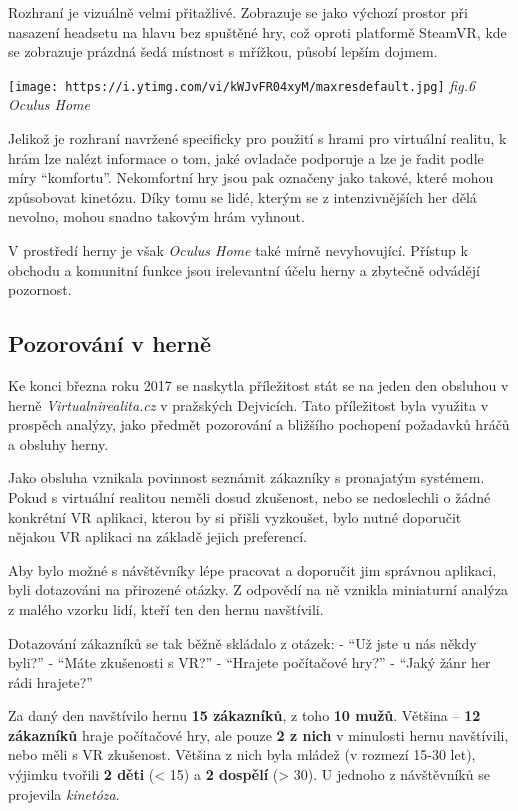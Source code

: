 Rozhraní je vizuálně velmi přitažlivé. Zobrazuje se jako výchozí prostor
při nasazení headsetu na hlavu bez spuštěné hry, což oproti platformě
SteamVR, kde se zobrazuje prázdná šedá místnost s mřížkou, působí lepším
dojmem.

\texttt{[image: https://i.ytimg.com/vi/kWJvFR04xyM/maxresdefault.jpg]}
\emph{fig.6 Oculus Home}

Jelikož je rozhraní navržené specificky pro použití s hrami pro
virtuální realitu, k hrám lze nalézt informace o tom, jaké ovladače
podporuje a lze je řadit podle míry ``komfortu''. Nekomfortní hry jsou
pak označeny jako takové, které mohou způsobovat kinetózu. Díky tomu se
lidé, kterým se z intenzivnějších her dělá nevolno, mohou snadno takovým
hrám vyhnout.

V prostředí herny je však \emph{Oculus Home} také mírně nevyhovující.
Přístup k obchodu a komunitní funkce jsou irelevantní účelu herny a
zbytečně odvádějí pozornost.

\subsection{Pozorování v herně}\label{pozorovuxe1nuxed-v-hernux11b}

Ke konci března roku 2017 se naskytla příležitost stát se na jeden den
obsluhou v herně \emph{Virtualnirealita.cz} v pražských Dejvicích. Tato
příležitost byla využita v prospěch analýzy, jako předmět pozorování a
bližšího pochopení požadavků hráčů a obsluhy herny.

Jako obsluha vznikala povinnost seznámit zákazníky s pronajatým
systémem. Pokud s virtuální realitou neměli dosud zkušenost, nebo se
nedoslechli o žádné konkrétní VR aplikaci, kterou by si přišli
vyzkoušet, bylo nutné doporučit nějakou VR aplikaci na základě jejich
preferencí.

Aby bylo možné s návštěvníky lépe pracovat a doporučit jim správnou
aplikaci, byli dotazováni na přirozené otázky. Z odpovědí na ně vznikla
miniaturní analýza z malého vzorku lidí, kteří ten den hernu navštívili.

Dotazování zákazníků se tak běžně skládalo z otázek: - ``Už jste u nás
někdy byli?'' - ``Máte zkušenosti s VR?'' - ``Hrajete počítačové hry?''
- ``Jaký žánr her rádi hrajete?''

Za daný den navštívilo hernu \textbf{15 zákazníků}, z toho \textbf{10
mužů}. Většina -- \textbf{12 zákazníků} hraje počítačové hry, ale pouze
\textbf{2 z nich} v minulosti hernu navštívili, nebo měli s VR
zkušenost. Většina z nich byla mládež (v rozmezí 15-30 let), výjimku
tvořili \textbf{2 děti} (\textless{} 15) a \textbf{2 dospělí}
(\textgreater{} 30). U jednoho z návštěvníků se projevila
\emph{kinetóza}.


